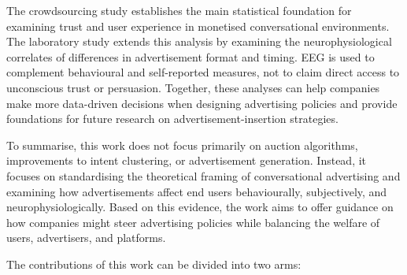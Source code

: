 \documentclass[english]{article}
\begin{document}
The crowdsourcing study establishes the main statistical foundation for examining
trust and user experience in monetised conversational environments. The laboratory
study extends this analysis by examining the neurophysiological correlates of
differences in advertisement format and timing. EEG is used to complement
behavioural and self-reported measures, not to claim direct access to unconscious
trust or persuasion. Together, these analyses can help companies make more
data-driven decisions when designing advertising policies and provide foundations
for future research on advertisement-insertion strategies.

To summarise, this work does not focus primarily on auction algorithms,
improvements to intent clustering, or advertisement generation. Instead, it focuses
on standardising the theoretical framing of conversational advertising
and examining how advertisements affect end users
behaviourally, subjectively, and neurophysiologically. Based on this evidence, the
work aims to offer guidance on how companies might steer advertising policies while
balancing the welfare of users, advertisers, and platforms.

The contributions of this work can be divided into two arms:
\end{document}
